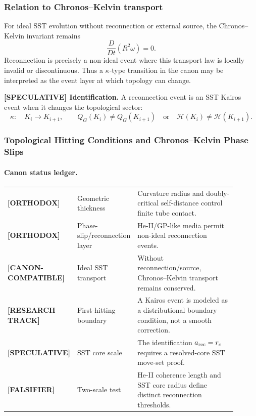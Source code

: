 \subsubsection{Relation to Chronos--Kelvin transport}
For ideal SST evolution without reconnection or external source, the Chronos--Kelvin invariant remains
\begin{equation}
    \frac{D}{Dt}\left(R^2\omega\right)=0.
\end{equation}
Reconnection is precisely a non-ideal event where this transport law is locally invalid or discontinuous. Thus a $\kappa$-type transition in the canon may be interpreted as the event layer at which topology can change.

\textbf{[SPECULATIVE] Identification.}
A reconnection event is an SST Kairos event when it changes the topological sector:
\begin{equation}
    \kappa:\quad K_i\rightarrow K_{i+1},
    \qquad
    Q_G(K_i)\neq Q_G(K_{i+1})
    \quad\text{or}\quad
    \mathcal H(K_i)\neq \mathcal H(K_{i+1}).
\end{equation}

\subsubsection{Topological Hitting Conditions and Chronos--Kelvin Phase Slips}
\label{subsubsec:chronos_kelvin_hitting_conditions}

\paragraph{Canon status ledger.}
\begin{center}
\small
\begin{tabular}{p{0.18\linewidth}p{0.24\linewidth}p{0.48\linewidth}}
\textbf{[ORTHODOX]} & Geometric thickness & Curvature radius and doubly-critical self-distance control finite tube contact.\\
\textbf{[ORTHODOX]} & Phase-slip/reconnection layer & He-II/GP-like media permit non-ideal reconnection events.\\
\textbf{[CANON-COMPATIBLE]} & Ideal SST transport & Without reconnection/source, Chronos--Kelvin transport remains conserved.\\
\textbf{[RESEARCH TRACK]} & First-hitting boundary & A Kairos event is modeled as a distributional boundary condition, not a smooth correction.\\
\textbf{[SPECULATIVE]} & SST core scale & The identification $a_{\rm rec}=r_c$ requires a resolved-core SST move-set proof.\\
\textbf{[FALSIFIER]} & Two-scale test & He-II coherence length and SST core radius define distinct reconnection thresholds.
\end{tabular}
\end{center}

